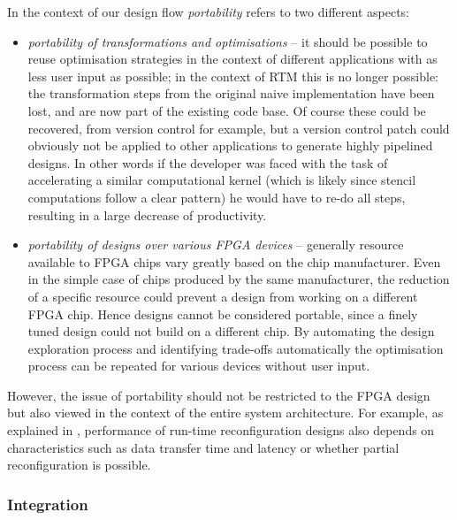 In the context of our design flow \emph{portability} refers to two
different aspects:
\begin{itemize}
\item \emph{portability of transformations and optimisations} -- it
  should be possible to reuse optimisation strategies in the context
  of different applications with as less user input as possible; in
  the context of RTM this is no longer possible: the transformation
  steps from the original naive implementation have been lost, and are
  now part of the existing code base. Of course these could be
  recovered, from version control for example, but a version control
  patch could obviously not be applied to other applications to
  generate highly pipelined designs. In other words if the developer
  was faced with the task of accelerating a similar computational
  kernel (which is likely since stencil computations follow a clear
  pattern) he would have to re-do all steps, resulting in a large
  decrease of productivity.

\item \emph{portability of designs over various FPGA devices} --
  generally resource available to FPGA chips vary greatly based on the
  chip manufacturer. Even in the simple case of chips produced by the
  same manufacturer, the reduction of a specific resource could
  prevent a design from working on a different FPGA chip. Hence
  designs cannot be considered portable, since a finely tuned design
  could not build on a different chip. By automating the design
  exploration process and identifying trade-offs automatically the
  optimisation process can be repeated for various devices without
  user input.
\end{itemize}

However, the issue of portability should not be restricted to the FPGA
design but also viewed in the context of the entire system
architecture. For example, as explained in
, performance of run-time
reconfiguration designs also depends on characteristics such as data
transfer time and latency or whether partial reconfiguration is
possible.



\subsubsection{Integration}

